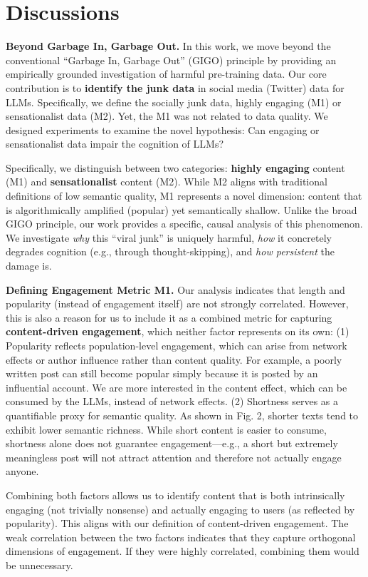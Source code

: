 \section{Discussions}

\textbf{Beyond Garbage In, Garbage Out.}
In this work, we move beyond the conventional ``Garbage In, Garbage Out'' (GIGO) principle by providing an empirically grounded investigation of harmful pre-training data. Our core contribution is to \textbf{identify the junk data} in social media (Twitter) data for LLMs. Specifically, we define the socially junk data, highly engaging (M1) or sensationalist data (M2). Yet, the M1 was not related to data quality. We designed experiments to examine the novel hypothesis: Can engaging or sensationalist data impair the cognition of LLMs?

Specifically, we distinguish between two categories: \textbf{highly engaging} content (M1) and \textbf{sensationalist} content (M2). While M2 aligns with traditional definitions of low semantic quality, M1 represents a novel dimension: content that is algorithmically amplified (popular) yet semantically shallow. 
Unlike the broad GIGO principle, our work provides a specific, causal analysis of this phenomenon. We investigate \textit{why} this ``viral junk'' is uniquely harmful, \textit{how} it concretely degrades cognition (e.g., through thought-skipping), and \textit{how persistent} the damage is.

\textbf{Defining Engagement Metric M1.}
Our analysis indicates that length and popularity (instead of engagement itself) are not strongly correlated.
However, this is also a reason for us to include it as a combined metric for capturing \textbf{content-driven engagement}, which neither factor represents on its own: (1) Popularity reflects population-level engagement, which can arise from network effects or author influence rather than content quality. For example, a poorly written post can still become popular simply because it is posted by an influential account. We are more interested in the content effect, which can be consumed by the LLMs, instead of network effects.
(2) Shortness serves as a quantifiable proxy for semantic quality. As shown in Fig. 2, shorter texts tend to exhibit lower semantic richness. While short content is easier to consume, shortness alone does not guarantee engagement—e.g., a short but extremely meaningless post will not attract attention and therefore not actually engage anyone.

Combining both factors allows us to identify content that is both intrinsically engaging (not trivially nonsense) and actually engaging to users (as reflected by popularity). This aligns with our definition of content-driven engagement.
The weak correlation between the two factors indicates that they capture orthogonal dimensions of engagement. If they were highly correlated, combining them would be unnecessary.


